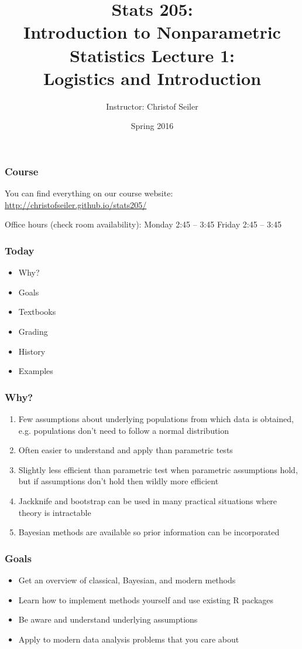 \documentclass[10pt]{beamer}
\title{\large \bfseries Stats 205: \\ Introduction to Nonparametric Statistics \linebreak \linebreak \linebreak
Lecture 1: \\ Logistics and Introduction}
\author{Instructor: Christof Seiler}
\date{Spring 2016}
\begin{document}
\frame{
\thispagestyle{empty}
\titlepage
}

\begin{frame}
\frametitle{Course}

You can find everything on our course website:
\url{http://christofseiler.github.io/stats205/} \newline

Office hours (\alert{check room availability}): \newline
Monday 2:45 -- 3:45 \newline
Friday 2:45 -- 3:45

\end{frame}

\begin{frame}
\frametitle{Today}

\begin{itemize}
\item Why?
\item Goals
\item Textbooks
\item Grading
\item History
\item Examples
\end{itemize}

\end{frame}

\begin{frame}
\frametitle{Why?}

\begin{enumerate}
\item Few assumptions about underlying populations from which data is obtained, e.g. populations don't need to follow a normal distribution
\item Often easier to understand and apply than parametric tests
\item Slightly less efficient than parametric test when parametric assumptions hold, but if assumptions don't hold then wildly more efficient
\item Jackknife and bootstrap can be used in many practical situations where theory is intractable
\item Bayesian methods are available so prior information can be incorporated
\end{enumerate}

\end{frame}

\begin{frame}
\frametitle{Goals}

\begin{itemize}
\item Get an overview of classical, Bayesian, and modern methods
\item Learn how to implement methods yourself and use existing R packages
\item Be aware and understand underlying assumptions
\item Apply to modern data analysis problems that you care about
\end{itemize}

\end{frame}
\end{document}
